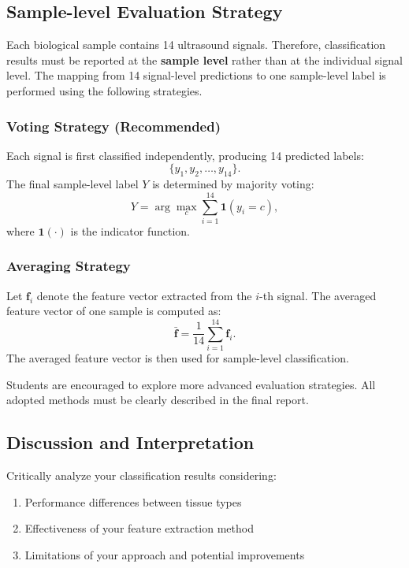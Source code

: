 \documentclass[11pt]{article}
\begin{document}
\subsection{Sample-level Evaluation Strategy}

Each biological sample contains 14 ultrasound signals. Therefore, classification results must be reported at the \textbf{sample level} rather than at the individual signal level. The mapping from 14 signal-level predictions to one sample-level label is performed using the following strategies.

\subsubsection{Voting Strategy (Recommended)}

Each signal is first classified independently, producing 14 predicted labels:
\begin{equation}
    \{y_1,y_2,\ldots,y_{14}\}.
\end{equation}
The final sample-level label $Y$ is determined by majority voting:
\begin{equation}
    Y=\arg\max_c\sum_{i=1}^{14}\mathbf{1}(y_i=c),
\end{equation}
where $\mathbf{1}(\cdot)$ is the indicator function.

\subsubsection{Averaging Strategy}

Let $\mathbf{f}_i$ denote the feature vector extracted from the $i$-th signal. The averaged feature vector of one sample is computed as:
\begin{equation}
    \bar{\mathbf{f}}=\frac{1}{14}\sum_{i=1}^{14}\mathbf{f}_i.
\end{equation}
The averaged feature vector is then used for sample-level classification.

Students are encouraged to explore more advanced evaluation strategies. All adopted methods must be clearly described in the final report.

\subsection{Discussion and Interpretation}

Critically analyze your classification results considering:
\begin{enumerate}[label=\roman*).]
    \item Performance differences between tissue types
    \item Effectiveness of your feature extraction method
    \item Limitations of your approach and potential improvements
\end{enumerate}
\end{document}
